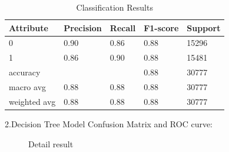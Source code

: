 \documentclass[
  journal=medium,
  manuscript=Report,
  year=2023,
  volume=37,
]{cup-journal}
\begin{document}
\begin{table}[!htbp]
    \begin{threeparttable}
    \caption{Classification Results}
    \label{Result1}
    \begin{tabular}{lllll}
        \toprule
        \headrow Attribute & Precision & Recall & F1-score & Support\\
        \midrule
        0 & 0.90 & 0.86 & 0.88 & 15296 \\ 
        \midrule
        1 & 0.86 & 0.90 & 0.88 & 15481 \\ 
        \midrule
        accuracy &   &   & 0.88 & 30777\\ 
        \midrule
        macro avg & 0.88 & 0.88 & 0.88 & 30777\\ 
        \midrule
        weighted avg & 0.88 & 0.88 & 0.88 & 30777\\  
        \bottomrule 
    \end{tabular}
\end{threeparttable}
\end{table}

2.Decision Tree Model Confusion Matrix and ROC curve:

\begin{figure}[!htbp]
    \centering
    \hfill
    \caption{Detail result}
    \label{combine3}
\end{figure}
\end{document}
